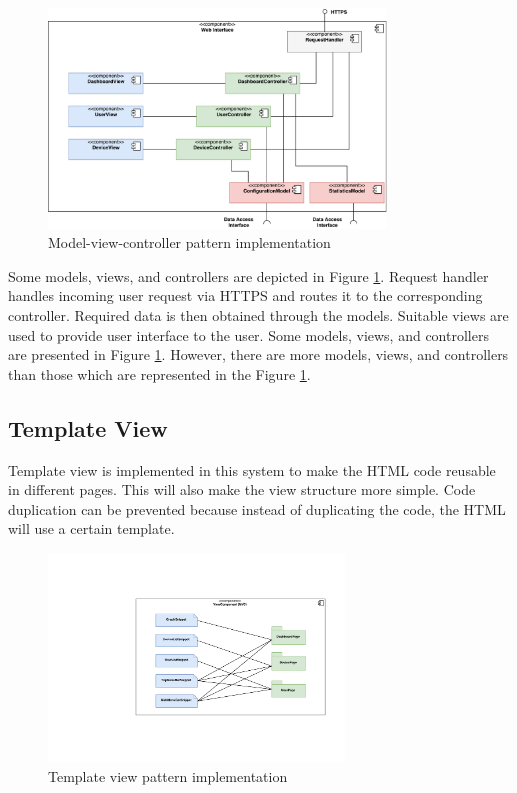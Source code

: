 \begin{figure}[H]
	\centering
	\includegraphics[width=0.8\textwidth]{7-software/images/mvc.pdf}
	\caption{Model-view-controller pattern implementation}
	\label{fig:mvc-architecture}
\end{figure}

Some models, views, and controllers are depicted in Figure \ref{fig:mvc-architecture}. Request handler handles incoming user request via HTTPS and routes it to the corresponding controller. Required data is then obtained through the models. Suitable views are used to provide user interface to the user. Some models, views, and controllers are presented in Figure \ref{fig:mvc-architecture}. However, there are more models, views, and controllers than those which are represented in the Figure \ref{fig:mvc-architecture}.

\clearpage
\subsection{Template View}
\label{sec:template-view}
Template view is implemented in this system to make the HTML code reusable in different pages. This will also make the view structure more simple. Code duplication can be prevented because instead of duplicating the code, the HTML will use a certain template.

\begin{figure}[H]
	\centering
	\includegraphics[width=0.7\textwidth]{7-software/images/template-view.pdf}
	\caption{Template view pattern implementation}
	\label{fig:template-view-architecture}
\end{figure}

